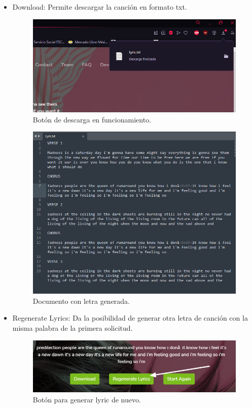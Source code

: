 \documentclass[12pt, a4paper, titlepage]{report}
\begin{document}
\begin{itemize}
	\item Download: Permite descargar la canción en formato txt.
	
	\begin{figure}[H] 
		\includegraphics[width=13.5cm]{./imagenes/Pruebas/Download.png}
		\centering \caption{Botón de descarga en funcionamiento.}
	\end{figure}

	\begin{figure}[H] 
		\includegraphics[width=13.5cm]{./imagenes/Pruebas/Textodescargado.png}
		\centering \caption{Documento con letra generada.}
	\end{figure}
	\newpage
	\item Regenerate Lyrics: Da la posibilidad de generar otra letra de canción con la misma palabra de la primera solicitud.
	
	\begin{figure}[H] 
		\includegraphics[width=13.5cm]{./imagenes/Pruebas/BotRegen.png}
		\centering \caption{Botón para generar lyric de nuevo.}
	\end{figure}
		

\end{itemize}
\end{document}
